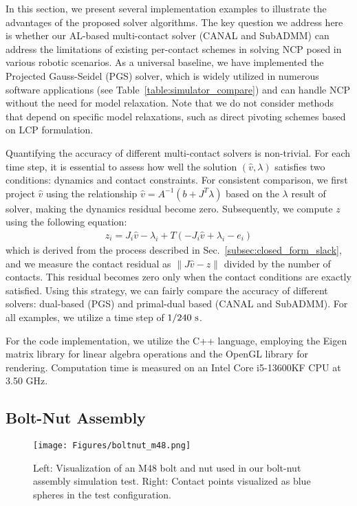 \documentclass[lettersize,journal]{IEEEtran}
\begin{document}
In this section, we present several implementation examples to illustrate the advantages of the proposed solver algorithms. The key question we address here is whether our AL-based multi-contact solver (CANAL and SubADMM) can address the limitations of existing per-contact schemes in solving NCP posed in various robotic scenarios. 
As a universal baseline, we have implemented the Projected Gauss-Seidel (PGS) solver, which is widely utilized in numerous software applications (see Table~\ref{table:simulator_compare}) and can handle NCP without the need for model relaxation. 
Note that we do not consider methods that depend on specific model relaxations, such as direct pivoting schemes based on LCP formulation. 

Quantifying the accuracy of different multi-contact solvers is non-trivial. 
For each time step, it is essential to assess how well the solution $(\hat{v}, \lambda)$ satisfies two conditions: dynamics and contact constraints. 
For consistent comparison, we first project $\hat{v}$ using the relationship $\hat{v} = A^{-1}(b + J^T\lambda)$ based on the $\lambda$ result of solver, making the dynamics residual become zero. 
Subsequently, we compute $z$ using the following equation:
\begin{align*}
    z_i = J_i\hat{v} - \lambda_i + T(-J_i\hat{v} + \lambda_i - e_i)
\end{align*}
which is derived from the process described in Sec.~\ref{subsec:closed_form_slack}, and we measure the contact residual as $\|J\hat{v} - z\|$ divided by the number of contacts. This residual becomes zero only when the contact conditions are exactly satisfied. Using this strategy, we can fairly compare the accuracy of different solvers: dual-based (PGS) and primal-dual based (CANAL and SubADMM).
For all examples, we utilize a time step of $1/240~\rm{s}$.

For the code implementation, we utilize the C++ language, employing the Eigen matrix library \cite{eigenweb} for linear algebra operations and the OpenGL library for rendering. Computation time is measured on an Intel Core i5-13600KF CPU at 3.50 GHz.


\subsection{Bolt-Nut Assembly} \label{subsec:exp_boltnut}

\begin{figure}[t]
\centering
\texttt{[image: Figures/boltnut\_m48.png]}
\caption{Left: Visualization of an M48 bolt and nut used in our bolt-nut assembly simulation test. Right: Contact points visualized as blue spheres in the test configuration.}
\label{fig:boltnut_m48}
\end{figure}
\end{document}
